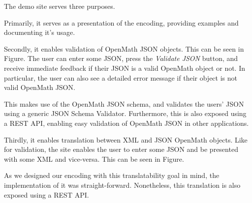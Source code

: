 The demo site serves three purposes.

Primarily, it serves as a presentation of the encoding, providing examples and documenting it's usage. 

Secondly, it enables validation of OpenMath JSON objects. This can be seen in Figure.
The user can enter some JSON, press the \textit{Validate JSON} button, and receive immediate feedback if their JSON is a valid OpenMath object or not. 
In particular, the user can also see a detailed error message if their object is not valid OpenMath JSON. 

This makes use of the OpenMath JSON schema, and validates the users' JSON using a generic JSON Schema Validator. 
Furthermore, this is also exposed using a REST API, enabling easy validation of OpenMath JSON in other applications. 

Thirdly, it enables translation between XML and JSON OpenMath objects. 
Like for validation, the site enables the user to enter some JSON and be presented with some XML and vice-versa. 
This can be seen in Figure.

As we designed our encoding with this translatability goal in mind, the implementation of it was straight-forward. 
Nonetheless, this translation is also exposed using a REST API. 